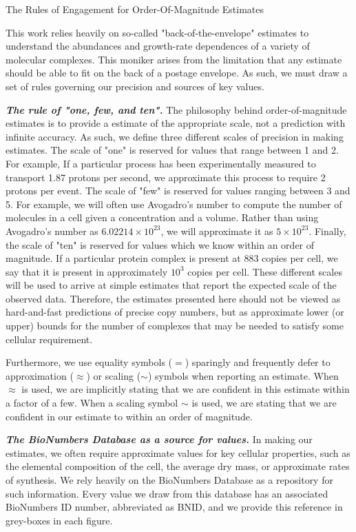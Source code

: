 \begin{featurebox}
\caption{The Rules of Engagement for Order-Of-Magnitude Estimates}
This work relies heavily on so-called "back-of-the-envelope" estimates to
understand the abundances and growth-rate dependences of a variety of molecular
complexes. This moniker arises from the limitation that any estimate should be
able to fit on the back of a postage envelope. As such, we must draw a set of
rules governing our precision and sources of key values.

\textbf{\itshape The rule of "one, few, and ten".} The philosophy behind
order-of-magnitude estimates is to provide a estimate of the appropriate scale,
not a prediction with infinite accuracy. As such, we define three different
scales of precision in making estimates. The scale of "one" is reserved for
values that range between 1 and 2. For example, If a particular process has been
experimentally measured to transport 1.87 protons per second, we approximate
this process to require 2 protons per event. The scale of "few" is reserved for
values ranging between 3 and 5. For example, we will often use Avogadro's number
to compute the number of molecules in a cell given a concentration and a volume.
Rather than using Avogadro's number as $6.02214 \times 10^{23}$, we will
approximate it as $5 \times 10^{23}$. Finally, the scale of "ten" is reserved
for values which we know within an order of magnitude. If a particular protein
complex is present at 883 copies per cell, we say that it is present in
approximately $10^3$ copies per cell. These different scales will be used
to arrive at simple estimates that report the expected scale of the
observed data. Therefore, the estimates  presented here should not be viewed as
hard-and-fast predictions of precise copy numbers, but as approximate lower (or upper)
bounds for the number of complexes that may be needed to satisfy some cellular requirement.

Furthermore, we use equality symbols ($=$) sparingly and frequently defer to
approximation ($\approx$) or scaling ($\sim$) symbols when reporting an
estimate. When $\approx$ is used, we are implicitly stating that
we are confident in this estimate within a factor of a few. When a scaling
symbol $\sim$ is used, we are stating that we are confident in our estimate to
within an order of magnitude.

\textbf{\itshape The BioNumbers Database as a source for values.} In making our
estimates, we often require approximate values for key cellular properties, such
as the elemental composition of the cell, the average dry mass, or approximate
rates of synthesis. We rely heavily on the BioNumbers Database \citep{milo2010}
as a repository for such information. Every value we draw from this database has
an associated BioNumbers ID number, abbreviated as BNID, and we provide this
reference in grey-boxes in each  figure.


\end{featurebox}
